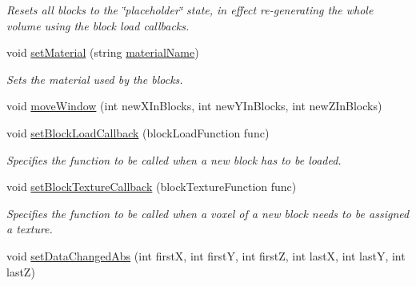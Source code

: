 \begin{DoxyCompactItemize}
\begin{DoxyCompactList}\small\item\em \-Resets all blocks to the \char`\"{}placeholder\char`\"{} state, in effect re-\/generating the whole volume using the block load callbacks. \end{DoxyCompactList}\item 
\hypertarget{classVoxelVolume_a70a87cce5bf1641ba8e6e30608fd9217}{
void \hyperlink{classVoxelVolume_a70a87cce5bf1641ba8e6e30608fd9217}{set\-Material} (string \hyperlink{classVoxelVolume_abed67eb7cc7050692c9db909008bb465}{material\-Name})}
\label{d0/d1c/classVoxelVolume_a70a87cce5bf1641ba8e6e30608fd9217}

\begin{DoxyCompactList}\small\item\em \-Sets the material used by the blocks. \end{DoxyCompactList}\item 
void \hyperlink{classVoxelVolume_a835fe48979dc20e9b2ab534fdd74878c}{move\-Window} (int new\-X\-In\-Blocks, int new\-Y\-In\-Blocks, int new\-Z\-In\-Blocks)
\item 
\hypertarget{classVoxelVolume_ae64c5d813e837e1fe1dc7d8a807cec02}{
void \hyperlink{classVoxelVolume_ae64c5d813e837e1fe1dc7d8a807cec02}{set\-Block\-Load\-Callback} (block\-Load\-Function func)}
\label{d0/d1c/classVoxelVolume_ae64c5d813e837e1fe1dc7d8a807cec02}

\begin{DoxyCompactList}\small\item\em \-Specifies the function to be called when a new block has to be loaded. \end{DoxyCompactList}\item 
\hypertarget{classVoxelVolume_aa8250f421a17cac18ffc99df08d8095d}{
void \hyperlink{classVoxelVolume_aa8250f421a17cac18ffc99df08d8095d}{set\-Block\-Texture\-Callback} (block\-Texture\-Function func)}
\label{d0/d1c/classVoxelVolume_aa8250f421a17cac18ffc99df08d8095d}

\begin{DoxyCompactList}\small\item\em \-Specifies the function to be called when a voxel of a new block needs to be assigned a texture. \end{DoxyCompactList}\item 
\hypertarget{classVoxelVolume_aefb59c4252532e687630642d9cf6e4e4}{
void \hyperlink{classVoxelVolume_aefb59c4252532e687630642d9cf6e4e4}{set\-Data\-Changed\-Abs} (int first\-X, int first\-Y, int first\-Z, int last\-X, int last\-Y, int last\-Z)}
\label{d0/d1c/classVoxelVolume_aefb59c4252532e687630642d9cf6e4e4}


\end{DoxyCompactItemize}
